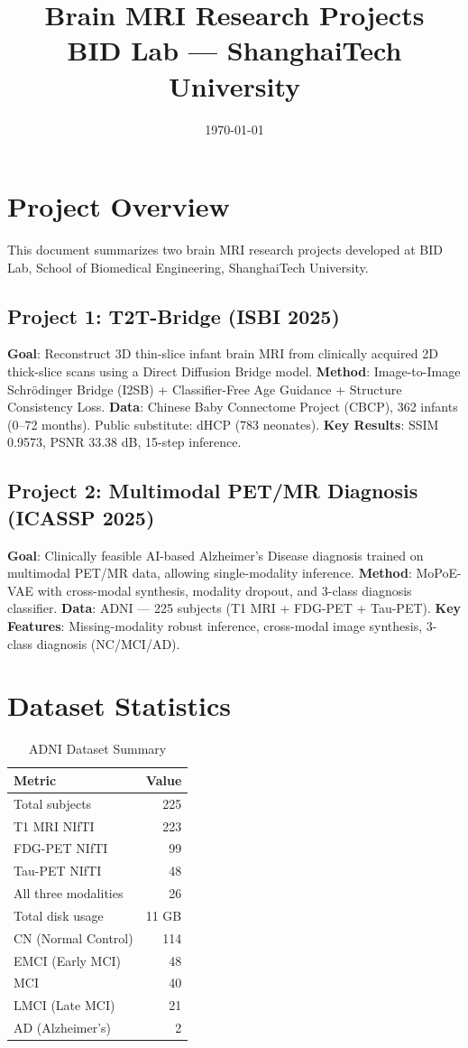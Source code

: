 \documentclass[11pt,a4paper]{article}
\title{\textbf{Brain MRI Research Projects}\\ \large BID Lab — ShanghaiTech University}
\author{}
\date{\today}
\begin{document}
\maketitle
\tableofcontents
\newpage

\section{Project Overview}
This document summarizes two brain MRI research projects developed at BID Lab, School of Biomedical Engineering, ShanghaiTech University.

\subsection{Project 1: T2T-Bridge (ISBI 2025)}
\textbf{Goal}: Reconstruct 3D thin-slice infant brain MRI from clinically acquired 2D thick-slice scans using a Direct Diffusion Bridge model.
\textbf{Method}: Image-to-Image Schr\"odinger Bridge (I2SB) + Classifier-Free Age Guidance + Structure Consistency Loss.
\textbf{Data}: Chinese Baby Connectome Project (CBCP), 362 infants (0--72 months). Public substitute: dHCP (783 neonates).
\textbf{Key Results}: SSIM 0.9573, PSNR 33.38 dB, 15-step inference.

\subsection{Project 2: Multimodal PET/MR Diagnosis (ICASSP 2025)}
\textbf{Goal}: Clinically feasible AI-based Alzheimer's Disease diagnosis trained on multimodal PET/MR data, allowing single-modality inference.
\textbf{Method}: MoPoE-VAE with cross-modal synthesis, modality dropout, and 3-class diagnosis classifier.
\textbf{Data}: ADNI — 225 subjects (T1 MRI + FDG-PET + Tau-PET).
\textbf{Key Features}: Missing-modality robust inference, cross-modal image synthesis, 3-class diagnosis (NC/MCI/AD).

\section{Dataset Statistics}

\begin{table}[H]
\centering
\caption{ADNI Dataset Summary}
\begin{tabular}{lr}
\toprule
\textbf{Metric} & \textbf{Value} \\
\midrule
Total subjects & 225 \\
T1 MRI NIfTI & 223 \\
FDG-PET NIfTI & 99 \\
Tau-PET NIfTI & 48 \\
All three modalities & 26 \\
Total disk usage & 11 GB \\
\midrule
CN (Normal Control) & 114 \\
EMCI (Early MCI) & 48 \\
MCI & 40 \\
LMCI (Late MCI) & 21 \\
AD (Alzheimer's) & 2 \\
\bottomrule
\end{tabular}
\end{table}
\end{document}
